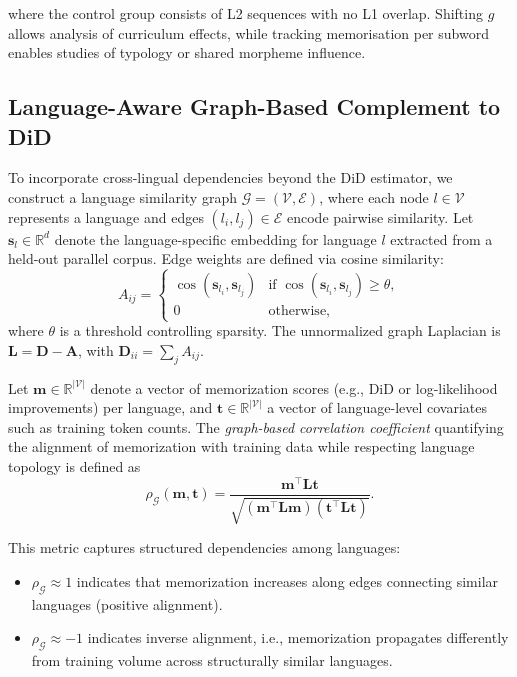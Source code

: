 where the control group consists of L2 sequences with no L1 overlap. Shifting $g$ allows analysis of curriculum effects, while tracking memorisation per subword enables studies of typology or shared morpheme influence.

\subsection{Language-Aware Graph-Based Complement to DiD}

To incorporate cross-lingual dependencies beyond the DiD estimator, we construct a language similarity graph $\mathcal{G} = (\mathcal{V}, \mathcal{E})$, where each node $l \in \mathcal{V}$ represents a language and edges $(l_i, l_j) \in \mathcal{E}$ encode pairwise similarity. Let $\mathbf{s}_l \in \mathbb{R}^d$ denote the language-specific embedding for language $l$ extracted from a held-out parallel corpus. Edge weights are defined via cosine similarity:
\begin{equation}
A_{ij} = 
\begin{cases}
\cos(\mathbf{s}_{l_i}, \mathbf{s}_{l_j}) & \text{if } \cos(\mathbf{s}_{l_i}, \mathbf{s}_{l_j}) \ge \theta, \\
0 & \text{otherwise},
\end{cases}
\end{equation}
where $\theta$ is a threshold controlling sparsity. The unnormalized graph Laplacian is $\mathbf{L} = \mathbf{D} - \mathbf{A}$, with $\mathbf{D}_{ii} = \sum_j A_{ij}$.

Let $\mathbf{m} \in \mathbb{R}^{|\mathcal{V}|}$ denote a vector of memorization scores (e.g., DiD or log-likelihood improvements) per language, and $\mathbf{t} \in \mathbb{R}^{|\mathcal{V}|}$ a vector of language-level covariates such as training token counts. The \emph{graph-based correlation coefficient} quantifying the alignment of memorization with training data while respecting language topology is defined as
\begin{equation}
\rho_{\mathcal{G}}(\mathbf{m}, \mathbf{t}) = 
\frac{\mathbf{m}^\top \mathbf{L} \mathbf{t}}
{\sqrt{(\mathbf{m}^\top \mathbf{L} \mathbf{m}) (\mathbf{t}^\top \mathbf{L} \mathbf{t})}}.
\end{equation}

This metric captures structured dependencies among languages:  

\begin{itemize}
    \item $\rho_{\mathcal{G}} \approx 1$ indicates that memorization increases along edges connecting similar languages (positive alignment).  
    \item $\rho_{\mathcal{G}} \approx -1$ indicates inverse alignment, i.e., memorization propagates differently from training volume across structurally similar languages.  
\end{itemize}


